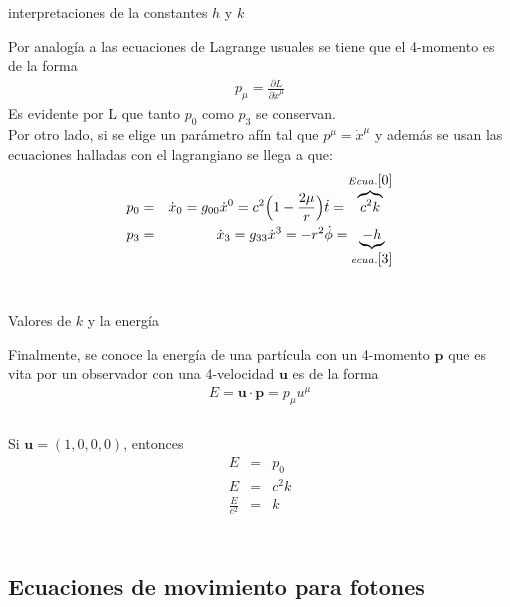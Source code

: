 \documentclass[xcolor=dvipsnames]{beamer}
\begin{document}
	
	\begin{frame}{interpretaciones de la constantes $h$ y $k$}
	    
	    \begin{block}{}
     Por analogía a las ecuaciones de Lagrange usuales se tiene que el 4-momento es de la forma
	    \begin{eqnarray*}
	    p_{\mu}=\frac{\partial L}{\partial \dot{x}^{\mu}}
        \end{eqnarray*}
        Es evidente por L que tanto $p_{0}$ como $p_{3}$ se conservan.\\ Por otro lado, si se elige un parámetro afín tal que $p^{\mu}=\dot{x}^{\mu}$ y además se usan las ecuaciones halladas con el lagrangiano  se llega a que: 
        \begin{eqnarray*}
	    p_{0}&=&\dot{x}_{0}=g_{00}\dot{x}^{0}= c^2\Big(1-\frac{2\mu}{r} \Big)\dot{t}=\overbrace{c^{2}k}^{Ecua. \ref{0}}\\
	    p_{3}&=&\dot{x}_{3}=g_{33}\dot{x}^{3}=-r^{2}\dot{\phi}=\underbrace{-h}_{ecua.\ref{3}}
        \end{eqnarray*}\\
        \end{block}
        \end{frame}
	
	
	\begin{frame}{Valores de $k$ y la energía}
	    
	    \begin{block}{}
    Finalmente, se conoce la energía de una partícula con un 4-momento $\textbf{p}$ que es vita por un observador con una 4-velocidad $\textbf{u}$ es de la forma
	    \begin{eqnarray*}
	    E=\textbf{u}\cdot \textbf{p}=p_{\mu} u^{\mu}\\
        \end{eqnarray*}\\
        Si $\textbf{u}=(1,0,0,0)$, entonces
        \begin{eqnarray*}
	    E&=&p_{0}\\
	    E&=&c^{2}k\\
	    \frac{E}{c^{2}}&=&k\\
        \end{eqnarray*}\\
        \end{block}
        \end{frame}


\subsection{Ecuaciones de movimiento para fotones}	
\end{document}
